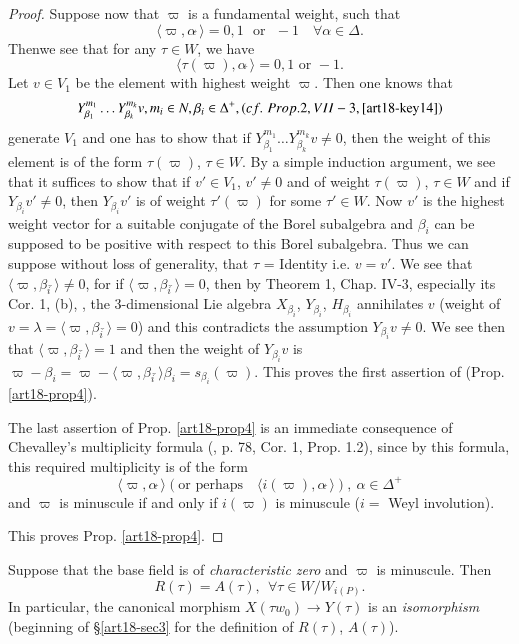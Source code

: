 \begin{proof}
Suppose now that $\varpi$ is a fundamental weight, such that 
$$
\langle \varpi, \alpha \check ~\rangle  = 0, 1 \text{~ or ~}  -1 \quad \forall \alpha \in \Delta.
$$
Then\pageoriginale we see that for any $\tau \in W$, we have
$$
\langle \tau (\varpi), \alpha \check ~\rangle =0, 1 \text{ or } -1.
$$
Let $v \in V_1$ be the element with highest weight $\varpi$. Then one knows that 
$$
Y^{m_1}_{\beta_1} \ldots Y^{m_k}_{\beta_k} v, m_i \in N, \beta_i \in \Delta^+, ({cf.}\kern.3em Prop. 2, VII-3, \cite{art18-key14})
$$
generate $V_1$ and one has to show that if $Y^{m_1}_{\beta_1} \ldots Y^{m_k}_{\beta_k} v \neq 0$, then the weight of this element is of the form $\tau(\varpi) $, $\tau \in W$. By a simple induction argument, we see that it suffices to show that if $v' \in V_1$, $v' \neq 0$ and of weight $\tau(\varpi)$, $\tau \in W$ and if $Y_{\beta_i} v' \neq 0$, then $Y_{\beta_i } v'$ is of weight $\tau'(\varpi)$ for some $\tau' \in W$. Now $v'$ is the highest weight vector for a suitable conjugate of the Borel subalgebra and $\beta_i$ can be supposed to be positive with respect to this Borel subalgebra. Thus we can suppose without loss of generality, that $\tau$ = Identity i.e. $v = v'$. We see that $\langle \varpi, \beta_i\check ~ \rangle \neq 0$, for  if $\langle \varpi, \beta_i\check~\rangle =0 $, then by Theorem 1, Chap. IV-3, especially its Cor. 1, (b), \cite{art18-key5}, the 3-dimensional Lie algebra $X_{\beta_i}$, $Y_{\beta_i}$, $H_{\beta_i}$ annihilates $v$ (weight of $v = \lambda = \langle \varpi, \beta_i\check ~\rangle  =0$) and this contradicts the assumption $Y_{\beta_i} v \neq 0$. We see then that $\langle \varpi, \beta_i\check~\rangle  =1$ and then the weight of $Y_{\beta_i} v$ is $\varpi - \beta_i = \varpi - \langle\varpi, \beta_i \check~ \rangle  \beta_i = s_{\beta_i} (\varpi)$. This proves the first assertion of (Prop. \ref{art18-prop4}).

The last assertion of Prop. \ref{art18-prop4} is an immediate consequence of Chevalley's multiplicity formula (\cf \cite{art18-key8}, p. 78, Cor. 1, Prop. 1.2), since by this formula, this required multiplicity is of the form 
$$
\langle \varpi, \alpha \check ~\rangle  (\text{or perhaps ~ } \langle i(\varpi), \alpha \check ~ \rangle ), ~ \alpha \in \Delta^+
$$
and $\varpi$ is minuscule if and only if $i(\varpi)$ is minuscule ($i= $ Weyl involution).

This proves Prop. \ref{art18-prop4}.
\end{proof}

\begin{remark}\label{art18-rem6}
Suppose that the base field is of {\em characteristic zero} and $\varpi$ is minuscule. Then
$$
R(\tau) = A(\tau), ~~ \forall \tau \in W / W_{i(P)}.
$$
In particular, the canonical morphism $X(\tau w_0) \to Y(\tau)$ is an {\em isomorphism } (\cf beginning of \S \ref{art18-sec3} for the definition of $R(\tau)$, $A(\tau)$).
\end{remark}

